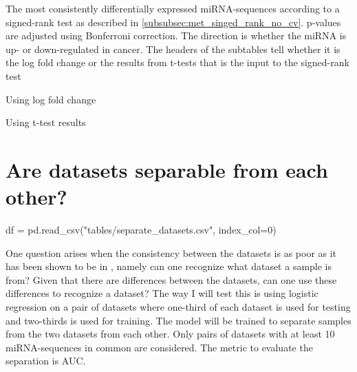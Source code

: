 {{{\begin{table}
    \caption{The most consistently differentially expressed miRNA-sequences according to a signed-rank test as described in \autoref{subsubsec:met_singed_rank_no_cv}. p-values are adjusted using Bonferroni correction. The direction is whether the miRNA is up- or down-regulated in cancer. The headers of the subtables tell whether it is the log fold change or the results from t-tests that is the input to the signed-rank test}
    \label{tab:signed_rank}
    \begin{subtable}[h]{0.5\textwidth}
        \caption{Using log fold change}
    \end{subtable}
    \begin{subtable}[h]{0.5\textwidth}
        \caption{Using t-test results}
    \end{subtable}
\end{table}

\section{Are datasets separable from each other?}
\label{sec:res_datasets_separable}
\begin{pycode}
df = pd.read_csv("tables/separate_datasets.csv", index_col=0)
\end{pycode}
One question arises when the consistency between the datasets is as poor as it has been shown to be in \citet{forprosjekt}, namely can one recognize what dataset a sample is from? Given that there are differences between the datasets, can one use these differences to recognize a dataset? The way I will test this is using logistic regression on a pair of datasets where one-third of each dataset is used for testing and two-thirds is used for training. The model will be trained to separate samples from the two datasets from each other. Only pairs of datasets with at least 10 miRNA-sequences in common are considered. The metric to evaluate the separation is AUC.

}}}
